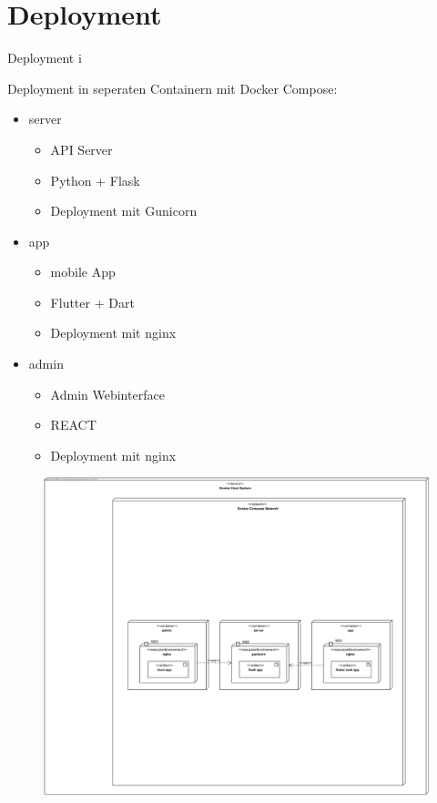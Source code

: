 \section{Deployment}

\begin{frame}{Deployment i}
    \begin{minipage}[t]{0.35\textwidth}
        Deployment in seperaten Containern mit Docker Compose:
        \begin{itemize}
            \item server
            \begin{itemize} 
                \item API Server
                \item Python + Flask
                \item Deployment mit Gunicorn
            \end{itemize}
            \item app
            \begin{itemize} 
                \item mobile App
                \item Flutter + Dart
                \item Deployment mit nginx
            \end{itemize}
            \item admin
            \begin{itemize} 
                \item Admin Webinterface
                \item REACT
                \item Deployment mit nginx
            \end{itemize}
        \end{itemize}
    \end{minipage}
    \hfill
    \begin{minipage}[t]{0.63\textwidth}
        \begin{figure}
            \begin{center}
                \includegraphics[width=\textwidth]{images/deployment/deployment_diagram_services.jpg}

\end{center}
\end{figure}
\end{minipage}
\end{frame}
